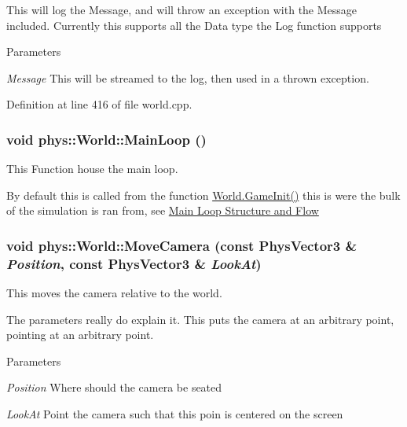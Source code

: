 This will log the Message, and will throw an exception with the Message included. Currently this supports all the Data type the Log function supports 
\begin{DoxyParams}{Parameters}
\item[{\em Message}]This will be streamed to the log, then used in a thrown exception. \end{DoxyParams}


Definition at line 416 of file world.cpp.

\hypertarget{classphys_1_1World_af1d9e36d43f5e50543fa2351a32c8362}{
\subsubsection[{MainLoop}]{\setlength{\rightskip}{0pt plus 5cm}void phys::World::MainLoop ()}}
\label{da/ddf/classphys_1_1World_af1d9e36d43f5e50543fa2351a32c8362}


This Function house the main loop. 

By default this is called from the function \hyperlink{classphys_1_1World_a21cc36be08a61f40619584d4c438936b}{World.GameInit()} this is were the bulk of the simulation is ran from, see \hyperlink{mainloop1}{Main Loop Structure and Flow} \hypertarget{classphys_1_1World_ad461d55f869f8aef72d0f0e0eb1b04dd}{
\subsubsection[{MoveCamera}]{\setlength{\rightskip}{0pt plus 5cm}void phys::World::MoveCamera (const {\bf PhysVector3} \& {\em Position}, \/  const {\bf PhysVector3} \& {\em LookAt})}}
\label{da/ddf/classphys_1_1World_ad461d55f869f8aef72d0f0e0eb1b04dd}


This moves the camera relative to the world. 

The parameters really do explain it. This puts the camera at an arbitrary point, pointing at an arbitrary point. 
\begin{DoxyParams}{Parameters}
\item[{\em Position}]Where should the camera be seated \item[{\em LookAt}]Point the camera such that this poin is centered on the screen \end{DoxyParams}


